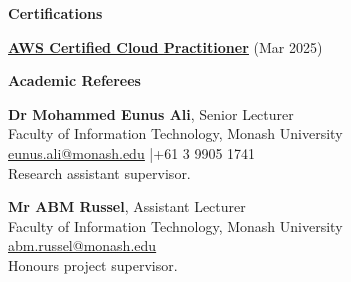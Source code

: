 \documentclass[11pt, a4paper]{article}
\let\hrefnoul\href
\renewcommand{\href}[2]{\hrefnoul{#1}{\ul{#2}}}
\newcommand{\resumesection}[1]{%
  \vspace{6pt}\par
  {\setlength{\fboxsep}{5pt}%
   \noindent\colorbox{sectionbg}{%
     \parbox{\dimexpr\linewidth-10pt\relax}{\strut\textbf{\large #1}\strut}%
   }}%
  \vspace{2pt}\par
}
\begin{document}
\resumesection{Certifications}

\vspace{3pt}
\noindent\href{https://aws.amazon.com/certification/certified-cloud-practitioner/}{\textbf{AWS Certified Cloud Practitioner}}
(Mar 2025)


\resumesection{Academic Referees}
\textbf{Dr Mohammed Eunus Ali}, Senior Lecturer\\
Faculty of Information Technology, Monash University\\
\href{mailto:eunus.ali@monash.edu}{eunus.ali@monash.edu} \enspace|\enspace +61 3 9905 1741\\
Research assistant supervisor.

\textbf{Mr ABM Russel}, Assistant Lecturer\\
Faculty of Information Technology, Monash University\\
\href{mailto:abm.russel@monash.edu}{abm.russel@monash.edu}\\
Honours project supervisor.
\end{document}
